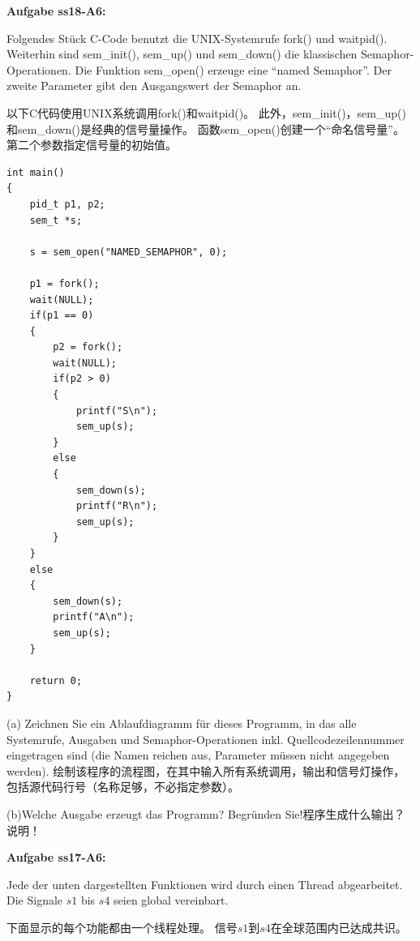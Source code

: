 \documentclass[fleqn]{article}
\begin{document}
\noindent\textbf{Aufgabe ss18-A6:}

Folgendes Stück C-Code benutzt die UNIX-Systemrufe fork() und waitpid(). 
Weiterhin sind sem\_init(), sem\_up() und sem\_down() die klassischen Semaphor-Operationen. 
Die Funktion sem\_open() erzeuge eine “named Semaphor”. 
Der zweite Parameter gibt den Ausgangswert der Semaphor an.

以下C代码使用UNIX系统调用fork()和waitpid()。
此外，sem\_init()，sem\_up()和sem\_down()是经典的信号量操作。
函数sem\_open()创建一个“命名信号量”。
第二个参数指定信号量的初始值。

\begin{lstlisting}
int main()
{
    pid_t p1, p2; 
    sem_t *s;

    s = sem_open("NAMED_SEMAPHOR", 0);

    p1 = fork(); 
    wait(NULL);
    if(p1 == 0) 
    {
        p2 = fork(); 
        wait(NULL);
        if(p2 > 0) 
        {
            printf("S\n"); 
            sem_up(s);
        }
        else 
        {
            sem_down(s); 
            printf("R\n"); 
            sem_up(s);
        } 
    }
    else 
    {
        sem_down(s); 
        printf("A\n"); 
        sem_up(s);
    } 

    return 0;
}
\end{lstlisting}

(a) Zeichnen Sie ein Ablaufdiagramm für dieses Programm, in das alle Systemrufe, Ausgaben und Semaphor-Operationen inkl. Quellcodezeilennummer eingetragen sind (die Namen reichen aus, Parameter müssen nicht angegeben werden).
绘制该程序的流程图，在其中输入所有系统调用，输出和信号灯操作，包括源代码行号（名称足够，不必指定参数）。

(b)Welche Ausgabe erzeugt das Programm? Begründen Sie!程序生成什么输出？ 说明！

\noindent\textbf{Aufgabe ss17-A6:}

Jede der unten dargestellten Funktionen wird durch einen Thread abgearbeitet. 
Die Signale $s1$ bis $s4$ seien global vereinbart.

下面显示的每个功能都由一个线程处理。
信号$ s1 $到$ s4 $在全球范围内已达成共识。
\end{document}
